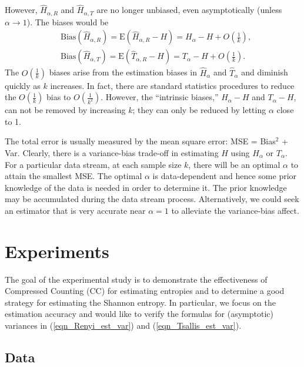 \documentclass{sig-alternate}
\begin{document}
However, $\hat{H}_{\alpha,R}$ and $\hat{H}_{\alpha,T}$ are no longer unbiased, even asymptotically (unless $\alpha\rightarrow 1$). The biases would be
\begin{align}\label{eqn_entropy_R_bias}
&\text{Bias}\left(\hat{H}_{\alpha,R}\right) = \text{E}\left( \hat{H}_{\alpha,R} - H\right) =  H_\alpha - H + O\left(\frac{1}{k}\right), \\\label{eqn_entropy_T_bias}
&\text{Bias}\left(\hat{H}_{\alpha,T}\right) = \text{E}\left( \hat{T}_{\alpha,R} - H\right) =  T_\alpha - H + O\left(\frac{1}{k}\right).
\end{align}
The $O\left(\frac{1}{k}\right)$  biases arise from the estimation biases in $\hat{H}_\alpha$ and $\hat{T}_\alpha$ and diminish  quickly as $k$ increases. In fact, there are standard statistics procedures to reduce the $O\left(\frac{1}{k}\right)$ bias to $O\left(\frac{1}{k^2}\right)$.  However, the ``intrinsic biases,'' $H_\alpha - H$ and $T_\alpha - H$, can not be removed by increasing $k$; they can only be reduced by letting $\alpha$ close to 1.



The total error is usually measured by the mean square error: MSE = Bias$^2$ + Var. Clearly, there is a variance-bias trade-off in estimating $H$ using $H_\alpha$ or $T_\alpha$.  For a particular data stream, at each sample size $k$, there will be an optimal $\alpha$ to attain the smallest MSE. The optimal $\alpha$ is data-dependent and hence some prior knowledge of the data is needed in order to determine it. The prior knowledge may be accumulated during the data stream process. Alternatively, we could seek an estimator that is very accurate near $\alpha=1$ to alleviate the variance-bias affect.

\section{Experiments}\label{sec_exp}

The goal of the experimental study is to demonstrate the effectiveness of Compressed Counting (CC) for estimating entropies and to determine a good strategy for estimating the Shannon entropy.  In particular, we focus on the estimation accuracy and would like to verify the formulas for (asymptotic) variances in (\ref{eqn_Renyi_est_var}) and (\ref{eqn_Tsallis_est_var}).  

\subsection{Data}
\end{document}
